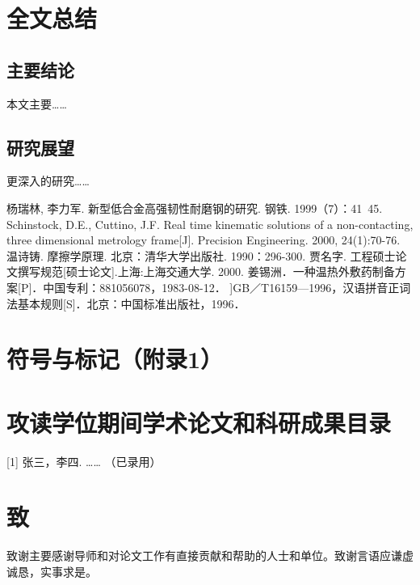 \documentclass[UTF8,a4paper,12pt]{ctexart}
\numberwithin{equation}{section}
\begin{document}
\section{全文总结}

\subsection{主要结论}
本文主要……

\subsection{研究展望}
更深入的研究……

\newpage
{}

\renewcommand\refname{参\quad考\quad文\quad献}
\begin{thebibliography}{1}
 杨瑞林, 李力军. 新型低合金高强韧性耐磨钢的研究. 钢铁. 1999（7）：41~45.
  Schinstock, D.E., Cuttino, J.F. Real time kinematic solutions of a non-contacting, three dimensional metrology frame[J]. Precision Engineering. 2000, 24(1):70-76. 
 温诗铸. 摩擦学原理. 北京：清华大学出版社. 1990：296-300.
 贾名字. 工程硕士论文撰写规范[硕士论文].上海:上海交通大学. 2000.
 姜锡洲．一种温热外敷药制备方案[P]．中国专利：881056078，1983-08-12．
]GB／T16159—1996，汉语拼音正词法基本规则[S]．北京：中国标准出版社，1996．
\end{thebibliography}

\newpage
{}

\section*{符号与标记（附录1）}

\newpage
{}

\section*{攻读学位期间学术论文和科研成果目录}

[1] 张三，李四. …… （已录用）

\newpage
{}

\section*{致}

\hspace{8mm}致谢主要感谢导师和对论文工作有直接贡献和帮助的人士和单位。致谢言语应谦虚诚恳，实事求是。
\end{document}
